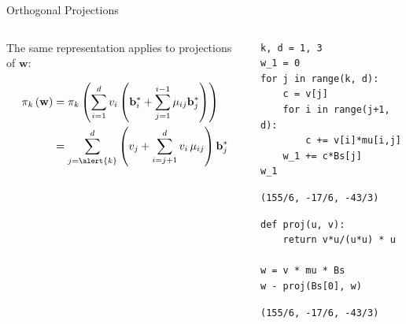 \documentclass[presentation,smaller]{beamer}
\renewcommand{\vec}[1]{\mathbf{#1}\xspace}
\begin{document}
\begin{frame}[fragile,label={sec:org840edcb}]{Orthogonal Projections}
 \begin{columns}[t]
\begin{column}{0.55\columnwidth}
The same representation applies to projections of \(\vec{w}\):

\begin{align*}
\pi_k\left(\vec{w}\right) &= \pi_k\left(\sum_{i=1}^{d} v_i \left(\vec{b}_i^* + \sum_{j=1}^{i-1} \mu_{ij} \vec{b}_j^* \right)\right)\\
                        &= \sum_{j=\alert{k}}^{d} \left(v_j  + \sum_{i=j+1}^{d} v_i\, \mu_{ij} \right) \vec{b}_j^*
\end{align*}
\end{column}

\begin{column}{0.45\columnwidth}
\lstset{language=sage,label= ,caption= ,captionpos=b,numbers=none}
\begin{lstlisting}
k, d = 1, 3
w_1 = 0
for j in range(k, d):
    c = v[j]
    for i in range(j+1, d):
        c += v[i]*mu[i,j]
    w_1 += c*Bs[j]
w_1
\end{lstlisting}

\begin{verbatim}
(155/6, -17/6, -43/3)
\end{verbatim}

\lstset{language=sage,label= ,caption= ,captionpos=b,numbers=none}
\begin{lstlisting}
def proj(u, v):
    return v*u/(u*u) * u

w = v * mu * Bs
w - proj(Bs[0], w)
\end{lstlisting}

\begin{verbatim}
(155/6, -17/6, -43/3)
\end{verbatim}
\end{column}
\end{columns}
\end{frame}
\end{document}
